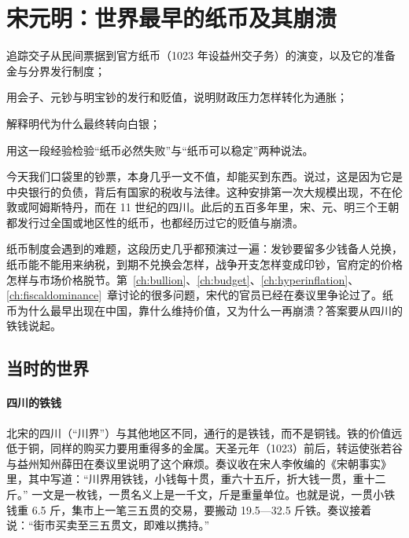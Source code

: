 \chapter{宋元明：世界最早的纸币及其崩溃}\label{ch:songming}

\begin{chapterguide}
\begin{guidegoals}
\item 追踪交子从民间票据到官方纸币（1023 年设益州交子务）的演变，以及它的准备金与分界发行制度；
\item 用会子、元钞与明宝钞的发行和贬值，说明财政压力怎样转化为通胀；
\item 解释明代为什么最终转向白银；
\item 用这一段经验检验“纸币必然失败”与“纸币可以稳定”两种说法。
\end{guidegoals}
\end{chapterguide}

今天我们口袋里的钞票，本身几乎一文不值，却能买到东西。说过，这是因为它是中央银行的负债，背后有国家的税收与法律。这种安排第一次大规模出现，不在伦敦或阿姆斯特丹，而在 11 世纪的四川。此后的五百多年里，宋、元、明三个王朝都发行过全国或地区性的纸币，也都经历过它的贬值与崩溃。

纸币制度会遇到的难题，这段历史几乎都预演过一遍：发钞要留多少钱备人兑换，纸币能不能用来纳税，到期不兑换会怎样，战争开支怎样变成印钞，官府定的价格怎样与市场价格脱节。第~\ref{ch:bullion}、\ref{ch:budget}、\ref{ch:hyperinflation}、\ref{ch:fiscaldominance}~章讨论的很多问题，宋代的官员已经在奏议里争论过了。纸币为什么最早出现在中国，靠什么维持价值，又为什么一再崩溃？答案要从四川的铁钱说起。

\section{当时的世界}\label{sec:songming-world}

\subsubsection{四川的铁钱}
北宋的四川（“川界”）与其他地区不同，通行的是铁钱，而不是铜钱。铁的价值远低于铜，同样的购买力要用重得多的金属。天圣元年（1023）前后，转运使张若谷与益州知州薛田在奏议里说明了这个麻烦。奏议收在宋人李攸编的《宋朝事实》里，其中写道：“川界用铁钱，小钱每十贯，重六十五斤，折大钱一贯，重十二斤。”\cite{songchaoshishi} 一文是一枚钱，一贯名义上是一千文，斤是重量单位。也就是说，一贯小铁钱重 6.5 斤，集市上一笔三五贯的交易，要搬动 19.5—32.5 斤铁。奏议接着说：“街市买卖至三五贯文，即难以携持。”

